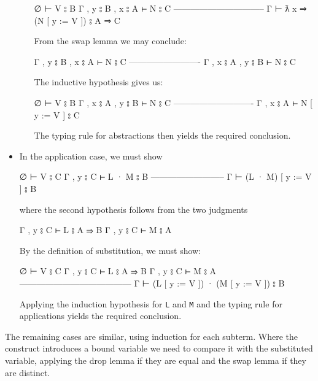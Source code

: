 \begin{itemize}
\begin{itemize}
    \begin{myDisplay}
    ∅ ⊢ V ⦂ B
    Γ , y ⦂ B , x ⦂ A ⊢ N ⦂ C
    --------------------------------
    Γ ⊢ ƛ x ⇒ (N [ y := V ]) ⦂ A ⇒ C
    \end{myDisplay}

    From the swap lemma we may conclude:

    \begin{myDisplay}
    Γ , y ⦂ B , x ⦂ A ⊢ N ⦂ C
    -------------------------
    Γ , x ⦂ A , y ⦂ B ⊢ N ⦂ C
    \end{myDisplay}

    The inductive hypothesis gives us:

    \begin{myDisplay}
    ∅ ⊢ V ⦂ B
    Γ , x ⦂ A , y ⦂ B ⊢ N ⦂ C
    ----------------------------
    Γ , x ⦂ A ⊢ N [ y := V ] ⦂ C
    \end{myDisplay}

    The typing rule for abstractions then yields the required
    conclusion.
  \end{itemize}
\item
  In the application case, we must show

  \begin{myDisplay}
  ∅ ⊢ V ⦂ C
  Γ , y ⦂ C ⊢ L · M ⦂ B
  --------------------------
  Γ ⊢ (L · M) [ y := V ] ⦂ B
  \end{myDisplay}

  where the second hypothesis follows from the two judgments

  \begin{myDisplay}
  Γ , y ⦂ C ⊢ L ⦂ A ⇒ B
  Γ , y ⦂ C ⊢ M ⦂ A
  \end{myDisplay}

  By the definition of substitution, we must show:

  \begin{myDisplay}
  ∅ ⊢ V ⦂ C
  Γ , y ⦂ C ⊢ L ⦂ A ⇒ B
  Γ , y ⦂ C ⊢ M ⦂ A
  ---------------------------------------
  Γ ⊢ (L [ y := V ]) · (M [ y := V ]) ⦂ B
  \end{myDisplay}

  Applying the induction hypothesis for \texttt{L} and \texttt{M} and
  the typing rule for applications yields the required conclusion.
\end{itemize}

The remaining cases are similar, using induction for each subterm. Where
the construct introduces a bound variable we need to compare it with the
substituted variable, applying the drop lemma if they are equal and the
swap lemma if they are distinct.

